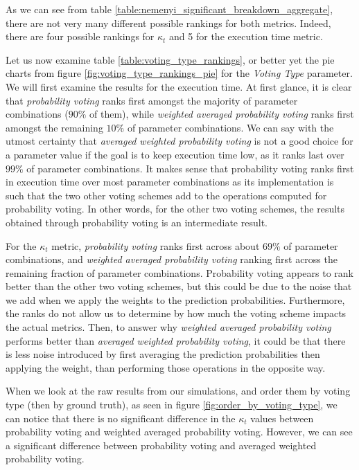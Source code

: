 As we can see from table \ref{table:nemenyi_significant_breakdown_aggregate}, there are not very many different possible rankings for both metrics. Indeed, there are four possible rankings for $\kappa_t$ and 5 for the execution time metric.

Let us now examine table \ref{table:voting_type_rankings}, or better yet the pie charts from figure \ref{fig:voting_type_rankings_pie} for the \textit{Voting Type} parameter.
We will first examine the results for the execution time. At first glance, it is clear that \textit{probability voting} ranks first amongst the majority of parameter combinations ($90\%$ of them), while \textit{weighted averaged probability voting} ranks first amongst the remaining $10\%$ of parameter combinations. We can say with the utmost certainty that \textit{averaged weighted probability voting} is not a good choice for a parameter value if the goal is to keep execution time low, as it ranks last over $99\%$ of parameter combinations. It makes sense that probability voting ranks first in execution time over most parameter combinations as its implementation is such that the two other voting schemes add to the operations computed for probability voting. In other words, for the other two voting schemes, the results obtained through probability voting is an intermediate result.

For the $\kappa_t$ metric, \textit{probability voting} ranks first across about $69\%$ of parameter combinations, and \textit{weighted averaged probability voting} ranking first across the remaining fraction of parameter combinations. Probability voting appears to rank better than the other two voting schemes, but this could be due to the noise that we add when we apply the weights to the prediction probabilities. Furthermore, the ranks do not allow us to determine by how much the voting scheme impacts the actual metrics. Then, to answer why \textit{weighted averaged probability voting} performs better than \textit{averaged weighted probability voting}, it could be that there is less noise introduced by first averaging the prediction probabilities then applying the weight, than performing those operations in the opposite way.

When we look at the raw results from our simulations, and order them by voting type (then by ground truth), as seen in figure \ref{fig:order_by_voting_type}, we can notice that there is no significant difference in the $\kappa_t$ values between probability voting and weighted averaged probability voting. However, we can see a significant difference between probability voting and averaged weighted probability voting.

